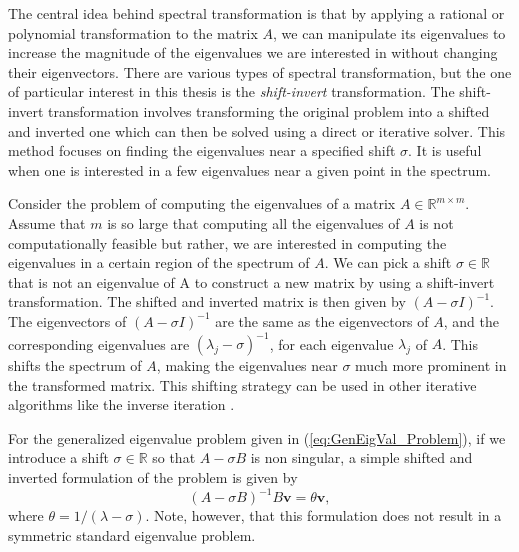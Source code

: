 The central idea behind spectral transformation is that by applying a rational or polynomial transformation to the matrix $A$, we can manipulate its eigenvalues to increase the magnitude of the eigenvalues we are interested in without changing their eigenvectors. There are various types of spectral transformation, but the one of particular interest in this thesis is the \textit{shift-invert} transformation. The shift-invert transformation involves transforming the original problem into a shifted and inverted one which can then be solved using a direct or iterative solver. This method focuses on finding the eigenvalues near a specified shift $\sigma$. It is useful when one is interested in a few eigenvalues near a given point in the spectrum.

Consider the problem of computing the eigenvalues of a matrix $A \in \mathbb{R}^{m \times m}$. Assume that $m$ is so large that computing all the eigenvalues of $A$ is not computationally feasible but rather, we are interested in computing the eigenvalues in a certain region of the spectrum of $A$. We can pick a shift $\sigma \in \mathbb{R}$ that is not an eigenvalue of A to construct a new matrix by using a shift-invert transformation. The shifted and inverted matrix is then given by $(A - \sigma I)^{-1}$. The eigenvectors of $(A - \sigma I)^{-1}$ are the same as the eigenvectors of $A$, and the corresponding eigenvalues are $(\lambda_j - \sigma)^{-1}$, for each eigenvalue $\lambda_j$ of $A$. This shifts the spectrum of $A$, making the eigenvalues near $\sigma$ much more prominent in the transformed matrix. This shifting strategy can be used in other iterative algorithms like the inverse iteration \cite{doi:10.1137/1.9781611977165}.

For the generalized eigenvalue problem given in (\ref{eq:GenEigVal_Problem}), if we introduce a shift $\sigma \in \mathbb{R}$ so that $A - \sigma B$ is non singular, a simple shifted and inverted formulation of the problem is given by
\begin{equation}\label{eq:SpectralTransFormulation}
	(A - \sigma B)^{-1} B\mathbf{v} = \theta \mathbf{v},
\end{equation}
where $\theta = 1 / (\lambda - \sigma)$.  Note, however, that this formulation does not result in a symmetric standard eigenvalue problem.

